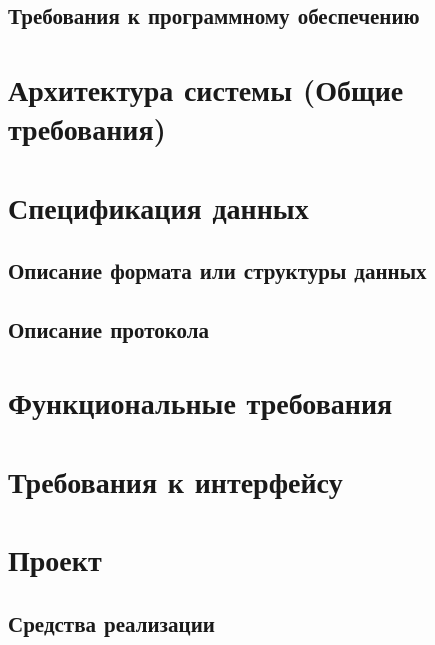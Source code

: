 \documentclass{fefu}
\begin{document}
  \subsection{Требования к программному обеспечению}
  

  \section{Архитектура системы (Общие требования)}
  

  \section{Спецификация данных}
  \subsection{Описание формата или структуры данных}
  
  \subsection{Описание протокола}
  

  \section{Функциональные требования}
  

  \section{Требования к интерфейсу}
  

  \section{Проект}
  \subsection{Средства реализации}
  
\end{document}
